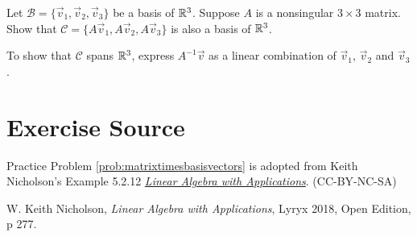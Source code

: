 \documentclass{ximera}
\begin{document}
\begin{problem}\label{prob:matrixtimesbasisvectors} 
Let $\mathcal{B}=\{\vec{v}_1, \vec{v}_2, \vec{v}_3\}$ be a basis of $\mathbb{R}^3$.  Suppose $A$ is a nonsingular $3\times 3 $ matrix.  Show that $\mathcal{C}=\{A\vec{v}_1, A\vec{v}_2, A\vec{v}_3\}$ is also a basis of $\mathbb{R}^3$. 
\begin{hint}
To show that $\mathcal{C}$ spans $\mathbb{R}^3$, express $A^{-1}\vec{v}$ as a linear combination of $\vec{v}_1$, $\vec{v}_2$ and $\vec{v}_3$.
\end{hint}

\end{problem}

\section*{Exercise Source}
Practice Problem \ref{prob:matrixtimesbasisvectors} is adopted from Keith Nicholson's Example 5.2.12  \href{https://open.umn.edu/opentextbooks/textbooks/linear-algebra-with-applications}{\it Linear Algebra with Applications}. (CC-BY-NC-SA)

W. Keith Nicholson, {\it Linear Algebra with Applications}, Lyryx 2018, Open Edition, p 277.
\end{document}
